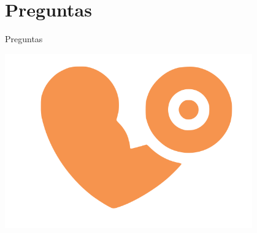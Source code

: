 \documentclass[12pt]{beamer}
\begin{document}
\section{Preguntas}
\begin{frame}{Preguntas}

\begin{center}
\includegraphics[width=0.8\textwidth]{gymodo_logo}
\end{center}


\end{frame}
\end{document}
